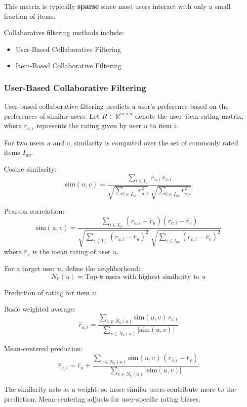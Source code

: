 \documentclass[10pt,a4paper]{article}
\begin{document}
	This matrix is typically \textbf{sparse} since most users interact with only a small fraction of items.

	Collaborative filtering methods include:

	\begin{itemize}
		\item User-Based Collaborative Filtering
		\item Item-Based Collaborative Filtering
	\end{itemize}

	\subsubsection{User-Based Collaborative Filtering}
	User-based collaborative filtering predicts a user's preference based on the preferences of similar users. Let $R \in \mathbb{R}^{m \times n}$ denote the user--item rating matrix, where $r_{u,i}$ represents the rating given by user $u$ to item $i$.

	\vspace{0.3em}

	For two users $u$ and $v$, similarity is computed over the set of commonly rated items $I_{uv}$.

	Cosine similarity:
	\[
	\text{sim}(u,v) =
	\frac{\sum_{i \in I_{uv}} r_{u,i}\, r_{v,i}}
	{\sqrt{\sum_{i \in I_{uv}} r_{u,i}^2}\;
		\sqrt{\sum_{i \in I_{uv}} r_{v,i}^2}}
	\]

	Pearson correlation:
	\[
	\text{sim}(u,v) =
	\frac{\sum_{i \in I_{uv}} (r_{u,i} - \bar{r}_u)(r_{v,i} - \bar{r}_v)}
	{\sqrt{\sum_{i \in I_{uv}} (r_{u,i} - \bar{r}_u)^2}\;
		\sqrt{\sum_{i \in I_{uv}} (r_{v,i} - \bar{r}_v)^2}}
	\]
	where $\bar{r}_u$ is the mean rating of user $u$.


	For a target user $u$, define the neighborhood:
	\[
	N_k(u) = \text{Top-}k \text{ users with highest similarity to } u
	\]

	Prediction of rating for item $i$:

	Basic weighted average:
	\[
	\hat{r}_{u,i} =
	\frac{\sum_{v \in N_k(u)} \text{sim}(u,v)\, r_{v,i}}
	{\sum_{v \in N_k(u)} |\text{sim}(u,v)|}
	\]

	Mean-centered prediction:
	\[
	\hat{r}_{u,i} =
	\bar{r}_u +
	\frac{\sum_{v \in N_k(u)} \text{sim}(u,v)\, (r_{v,i} - \bar{r}_v)}
	{\sum_{v \in N_k(u)} |\text{sim}(u,v)|}
	\]


	The similarity acts as a weight, so more similar users contribute more to the prediction. Mean-centering adjusts for user-specific rating biases.
\end{document}
